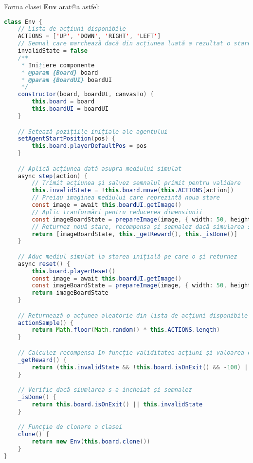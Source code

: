 
Forma clasei \textbf{Env} arat@a astfel:

\begin{lstlisting}[language=Java, caption=Definirea clasei Env]
class Env {
    // Lista de acțiuni disponibile
    ACTIONS = ['UP', 'DOWN', 'RIGHT', 'LEFT']
    // Semnal care marchează dacă din acțiunea luată a rezultat o stare invalidă
    invalidState = false
    /**
     * Inițiere componente
     * @param {Board} board 
     * @param {BoardUI} boardUI
     */
    constructor(board, boardUI, canvasTo) {
        this.board = board
        this.boardUI = boardUI
    }

    // Setează pozițiile inițiale ale agentului
    setAgentStartPosition(pos) {
        this.board.playerDefaultPos = pos
    }

    // Aplică acțiunea dată asupra mediului simulat
    async step(action) {
        // Trimit acțiunea și salvez semnalul primit pentru validare
        this.invalidState = !this.board.move(this.ACTIONS[action])
        // Preiau imaginea mediului care reprezintă noua stare
        const image = await this.boardUI.getImage()
        // Aplic tranformări pentru reducerea dimensiunii
        const imageBoardState = prepareImage(image, { width: 50, height: 50 })
        // Returnez nouă stare, recompensa și semnalez dacă simularea s-a încheiat
        return [imageBoardState, this._getReward(), this._isDone()]
    }

    // Aduc mediul simulat la starea inițială pe care o și returnez
    async reset() {
        this.board.playerReset()
        const image = await this.boardUI.getImage()
        const imageBoardState = prepareImage(image, { width: 50, height: 50 })
        return imageBoardState
    }

    // Returnează o acțunea aleatorie din lista de acțiuni disponibile
    actionSample() {
        return Math.floor(Math.random() * this.ACTIONS.length)
    }

    // Calculez recompensa în funcție validitatea acțiuni și valoarea celulei
    _getReward() {
        return (this.invalidState && !this.board.isOnExit() && -100) || this.board.getPlayerCellValue()
    }

    // Verific dacă siumlarea s-a incheiat și semnalez
    _isDone() {
        return this.board.isOnExit() || this.invalidState
    }

    // Funcție de clonare a clasei
    clone() {
        return new Env(this.board.clone())
    }
}
\end{lstlisting}


